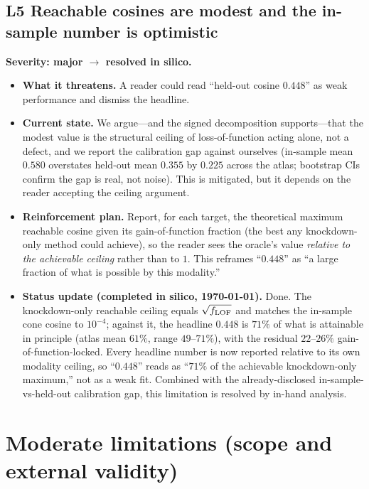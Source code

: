 \documentclass[11pt]{article}
\newcommand{\sev}[2]{\textcolor{#1}{\textbf{#2}}}
\begin{document}
\subsection{L5 \quad Reachable cosines are modest and the in-sample number is optimistic}
\sev{sev3}{Severity: major $\rightarrow$ resolved in silico.}
\begin{itemize}
\item[] \textbf{What it threatens.} A reader could read ``held-out cosine $0.448$'' as weak
performance and dismiss the headline.
\item[] \textbf{Current state.} We argue---and the signed decomposition supports---that the
modest value is the structural ceiling of loss-of-function acting alone, not a defect, and we
report the calibration gap against ourselves (in-sample mean $0.580$ overstates held-out mean
$0.355$ by $0.225$ across the atlas; bootstrap CIs confirm the gap is real, not noise). This is
mitigated, but it depends on the reader accepting the ceiling argument.
\item[] \textbf{Reinforcement plan.} Report, for each target, the theoretical maximum reachable
cosine given its gain-of-function fraction (the best any knockdown-only method could achieve),
so the reader sees the oracle's value \emph{relative to the achievable ceiling} rather than to
$1$. This reframes ``$0.448$'' as ``a large fraction of what is possible by this modality.''
\item[] \textbf{Status update (completed in silico, \today).} Done. The knockdown-only reachable
ceiling equals $\sqrt{\smash[b]{f_{\mathrm{LOF}}}}$ and matches the in-sample cone cosine to
$10^{-4}$; against it, the headline $0.448$ is $71\%$ of what is attainable in principle (atlas
mean $61\%$, range $49$--$71\%$), with the residual $22$--$26\%$ gain-of-function-locked. Every
headline number is now reported relative to its own modality ceiling, so ``$0.448$'' reads as
``$71\%$ of the achievable knockdown-only maximum,'' not as a weak fit. Combined with the
already-disclosed in-sample-vs-held-out calibration gap, this limitation is resolved by
in-hand analysis.
\end{itemize}

\section{Moderate limitations (scope and external validity)}
\end{document}

